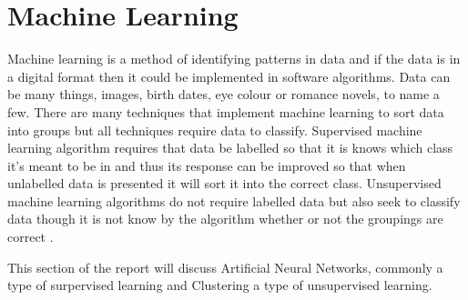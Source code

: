 \section{Machine Learning}

Machine learning is a method of identifying patterns in data and if the data is in a digital format then it could be implemented in software algorithms. Data can be many things, images, birth dates, eye colour or romance novels, to name a few. There are many techniques that implement machine learning to sort data into groups but all techniques require data to classify. Supervised machine learning algorithm requires that data be labelled so that it is knows which class it's meant to be in and thus its response can be improved so that when unlabelled data is presented it will sort it into the correct class. Unsupervised machine learning algorithms do not require labelled data but also seek to classify data though it is not know by the algorithm whether or not the groupings are correct \cite{patterns_machine_learning}.

This section of the report will discuss Artificial Neural Networks, commonly a type of surpervised learning and Clustering a type of unsupervised learning.


